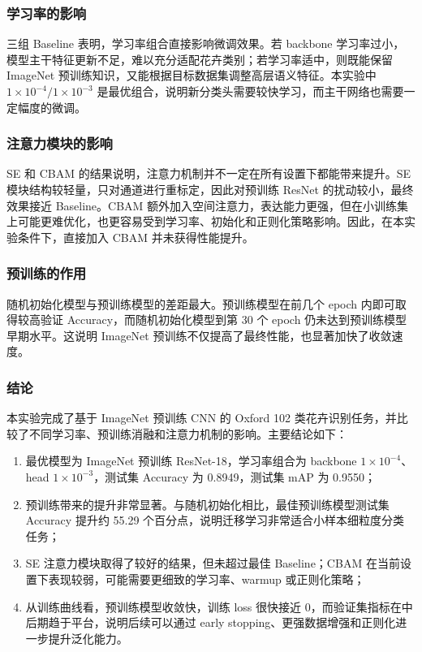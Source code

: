 \documentclass{article}
\begin{document}
\subsubsection{学习率的影响}
三组 Baseline 表明，学习率组合直接影响微调效果。若 backbone 学习率过小，模型主干特征更新不足，难以充分适配花卉类别；若学习率适中，则既能保留 ImageNet 预训练知识，又能根据目标数据集调整高层语义特征。本实验中 $1\times10^{-4}/1\times10^{-3}$ 是最优组合，说明新分类头需要较快学习，而主干网络也需要一定幅度的微调。

\subsubsection{注意力模块的影响}
SE 和 CBAM 的结果说明，注意力机制并不一定在所有设置下都能带来提升。SE 模块结构较轻量，只对通道进行重标定，因此对预训练 ResNet 的扰动较小，最终效果接近 Baseline。CBAM 额外加入空间注意力，表达能力更强，但在小训练集上可能更难优化，也更容易受到学习率、初始化和正则化策略影响。因此，在本实验条件下，直接加入 CBAM 并未获得性能提升。

\subsubsection{预训练的作用}
随机初始化模型与预训练模型的差距最大。预训练模型在前几个 epoch 内即可取得较高验证 Accuracy，而随机初始化模型到第 30 个 epoch 仍未达到预训练模型早期水平。这说明 ImageNet 预训练不仅提高了最终性能，也显著加快了收敛速度。

\subsubsection{结论}
本实验完成了基于 ImageNet 预训练 CNN 的 Oxford 102 类花卉识别任务，并比较了不同学习率、预训练消融和注意力机制的影响。主要结论如下：
\begin{enumerate}
    \item 最优模型为 ImageNet 预训练 ResNet-18，学习率组合为 backbone $1\times10^{-4}$、head $1\times10^{-3}$，测试集 Accuracy 为 0.8949，测试集 mAP 为 0.9550；
    \item 预训练带来的提升非常显著。与随机初始化相比，最佳预训练模型测试集 Accuracy 提升约 55.29 个百分点，说明迁移学习非常适合小样本细粒度分类任务；
    \item SE 注意力模块取得了较好的结果，但未超过最佳 Baseline；CBAM 在当前设置下表现较弱，可能需要更细致的学习率、warmup 或正则化策略；
    \item 从训练曲线看，预训练模型收敛快，训练 loss 很快接近 0，而验证集指标在中后期趋于平台，说明后续可以通过 early stopping、更强数据增强和正则化进一步提升泛化能力。
\end{enumerate}
\end{document}
